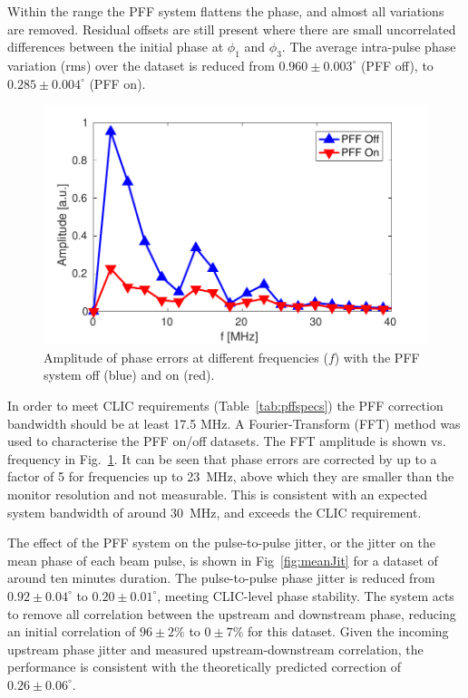 \documentclass[%
 reprint,
 superscriptaddress,
 amsmath,
 amssymb,
 prl,
]{revtex4-1}
\begin{document}
Within the range the PFF system flattens the phase, and almost all variations 
are removed. 
Residual offsets are still present where there are small uncorrelated 
differences between the initial phase at \(\phi_1\) and \(\phi_3\). 
The average intra-pulse phase variation (rms) over the dataset is reduced from 
\(0.960\pm0.003^\circ\) (PFF off), to \(0.285\pm0.004^\circ\) (PFF on).

\begin{figure}
	\includegraphics[width=\columnwidth]{figs/fft}
	\caption{\label{fig:fft}Amplitude of phase errors at different frequencies 
		(\(f\)) with the PFF system off (blue) and on (red).}
\end{figure}

In order to meet CLIC requirements (Table~\ref{tab:pffspecs}) the PFF 
correction bandwidth should be at least 17.5 MHz. 
A Fourier-Transform (FFT) method was used to characterise the PFF on/off 
datasets. The FFT amplitude is shown vs. frequency in 
Fig.~\ref{fig:fft}. It can be seen that phase errors are corrected by up to a 
factor of 5 for frequencies up to 23~MHz, above which 
they are smaller than the monitor resolution and not measurable. This 
is consistent with an expected system bandwidth of around 30~MHz, and exceeds 
the CLIC requirement.

The effect of the PFF system on the pulse-to-pulse jitter, or the jitter on the 
mean phase of each beam pulse, is shown in Fig~\ref{fig:meanJit} for a dataset 
of around ten minutes duration.
The pulse-to-pulse phase jitter is reduced from  \(0.92\pm0.04^\circ\) to 
\(0.20\pm0.01^\circ\), meeting CLIC-level phase stability. 
The system acts to remove all correlation between the upstream and 
downstream phase, reducing an initial correlation of \(96\pm2\%\) to 
\(0\pm7\%\) for this dataset.
Given the incoming upstream phase jitter and 
measured upstream-downstream correlation, the performance is consistent with 
the theoretically predicted correction of \(0.26\pm0.06^\circ\).
\end{document}
